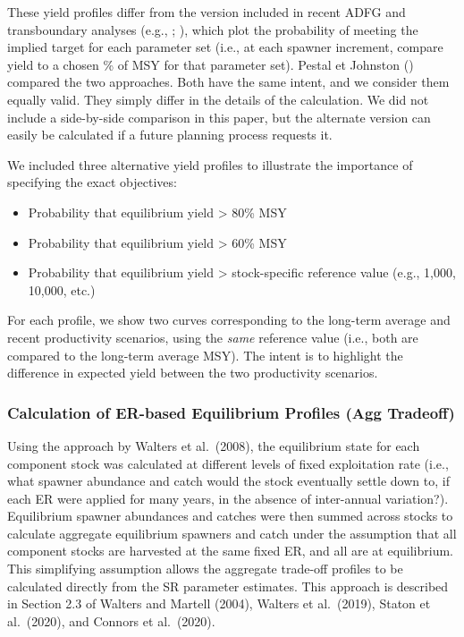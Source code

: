 \documentclass[french,11pt]{book}
\begin{document}
These yield profiles differ from the version included in recent ADFG and transboundary analyses (e.g., ; ), which plot the probability of meeting the implied target for each parameter set (i.e., at each spawner increment, compare yield to a chosen \% of MSY for that parameter set). Pestal et Johnston () compared the two approaches. Both have the same intent, and we consider them equally valid. They simply differ in the details of the calculation. We did not include a side-by-side comparison in this paper, but the alternate version can easily be calculated if a future planning process requests it.

We included three alternative yield profiles to illustrate the importance of specifying the exact objectives:
\begin{itemize}

\item
  Probability that equilibrium yield \textgreater{} 80\% MSY
\item
  Probability that equilibrium yield \textgreater{} 60\% MSY
\item
  Probability that equilibrium yield \textgreater{} stock-specific reference value (e.g., 1,000, 10,000, etc.)
\end{itemize}
For each profile, we show two curves corresponding to the long-term average and recent productivity scenarios, using the \emph{same} reference value (i.e., both are compared to the long-term average MSY). The intent is to highlight the difference in expected yield between the two productivity scenarios.

\subsubsection{Calculation of ER-based Equilibrium Profiles (Agg Tradeoff)}\label{calculation-of-er-based-equilibrium-profiles-agg-tradeoff}

Using the approach by Walters et al.~(2008), the equilibrium state for each component stock was calculated at different levels of fixed exploitation rate (i.e., what spawner abundance and catch would the stock eventually settle down to, if each ER were applied for many years, in the absence of inter-annual variation?). Equilibrium spawner abundances and catches were then summed across stocks to calculate aggregate equilibrium spawners and catch under the assumption that all component stocks are harvested at the same fixed ER, and all are at equilibrium. This simplifying assumption allows the aggregate trade-off profiles to be calculated directly from the SR parameter estimates. This approach is described in Section 2.3 of Walters and Martell (2004), Walters et al.~(2019), Staton et al.~(2020), and Connors et al.~(2020).
\end{document}
